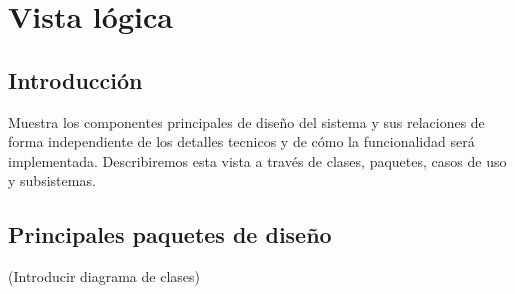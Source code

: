 \chapter{Vista l\'ogica}
\section{Introducci\'on}
Muestra los componentes principales de dise\~no del sistema y sus relaciones de forma independiente de los detalles tecnicos y de c\'omo la funcionalidad ser\'a implementada. Describiremos esta vista a trav\'es de clases, paquetes, casos de uso y subsistemas.
\section{Principales paquetes de dise\~no}


(Introducir diagrama de clases)

